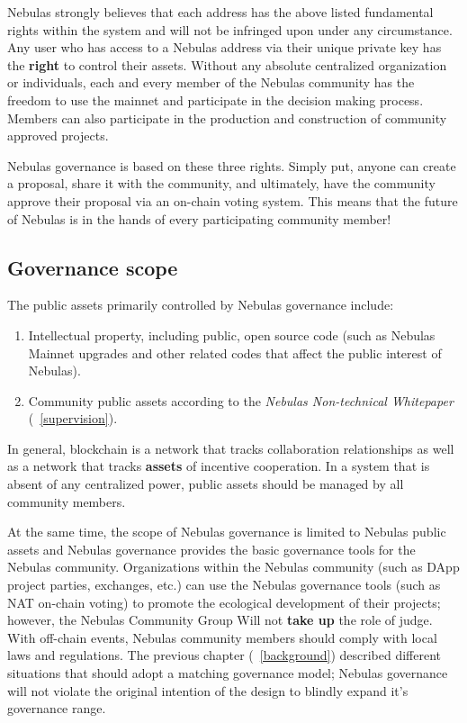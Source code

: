 Nebulas strongly believes that each address has the above listed fundamental rights within the system and will not be infringed upon under any circumstance. Any user who has access to a Nebulas address via their unique private key has the \textbf{right} to control their assets. Without any absolute centralized organization or individuals, each and every member of the Nebulas community has the freedom to use the mainnet and participate in the decision making process. Members can also participate in the production and construction of community approved projects. 

Nebulas governance is based on these three rights. Simply put, anyone can create a proposal, share it with the community, and ultimately, have the community approve their proposal via an on-chain voting system. This means that the future of Nebulas is in the hands of every participating community member!

\subsection{Governance scope}


The public assets primarily controlled by Nebulas governance include:

\begin{enumerate}
	\item Intellectual property, including public, open source code (such as Nebulas Mainnet upgrades and other related codes that affect the public interest of Nebulas).
	\item Community public assets according to the \textit{Nebulas Non-technical Whitepaper} (~\ref{supervision}).
\end{enumerate}

In general, blockchain is a network that tracks collaboration relationships as well as a network that tracks \textbf{assets} of incentive cooperation. In a system that is absent of any centralized power, public assets should be managed by all community members.

At the same time, the scope of Nebulas governance is limited to Nebulas public assets and Nebulas governance provides the basic governance tools for the Nebulas community. Organizations within the Nebulas community (such as DApp project parties, exchanges, etc.) can use the Nebulas governance tools (such as NAT on-chain voting) to promote the ecological development of their projects; however, the Nebulas Community Group Will not \textbf{take up} the role of judge. With off-chain events, Nebulas community members should comply with local laws and regulations. The previous chapter (~\ref{background}) described different situations that should adopt a matching governance model; Nebulas governance will not violate the original intention of the design to blindly expand it's governance range.

